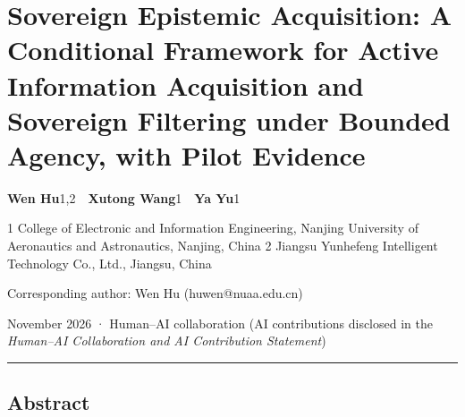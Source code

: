 \documentclass[
  11pt]{article}
\author{}
\date{3 November 2026}
\begin{document}
\section{Sovereign Epistemic Acquisition: A Conditional Framework for
Active Information Acquisition and Sovereign Filtering under Bounded
Agency, with Pilot
Evidence}\label{sovereign-epistemic-acquisition-a-conditional-framework-for-active-information-acquisition-and-sovereign-filtering-under-bounded-agency-with-pilot-evidence}

\textbf{Wen Hu}1,2~~\textbf{Xutong Wang}1~~\textbf{Ya Yu}1

1 College of Electronic and Information Engineering, Nanjing University
of Aeronautics and Astronautics, Nanjing, China 2 Jiangsu Yunhefeng
Intelligent Technology Co., Ltd., Jiangsu, China

Corresponding author: Wen Hu (huwen@nuaa.edu.cn)

November 2026 · Human--AI collaboration (AI contributions disclosed in
the \emph{Human--AI Collaboration and AI Contribution Statement})

\begin{center}\rule{0.5\linewidth}{0.5pt}\end{center}

\subsection{Abstract}\label{abstract}
\end{document}
